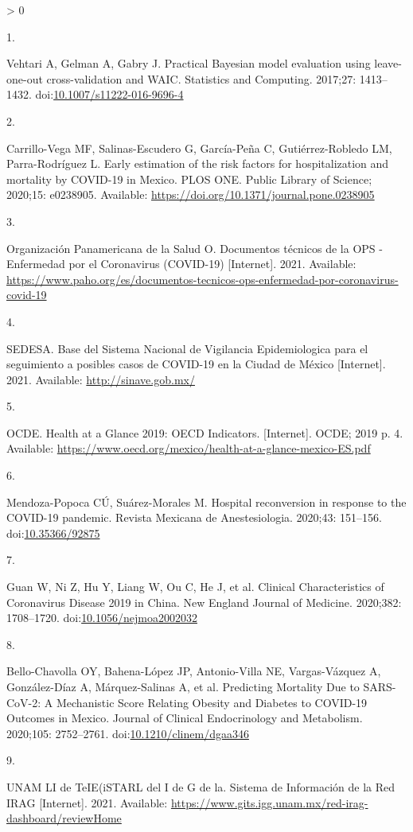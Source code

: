 \documentclass[10pt,letterpaper]{article}
\newlength{\csllabelwidth}
\newlength{\cslhangindent}
\newenvironment{CSLReferences}[3] %
 {%
  \setlength{\parindent}{0pt}
  \ifodd #1 \everypar{\setlength{\hangindent}{\cslhangindent}}\ignorespaces\fi
  \ifnum #2 > 0
  \setlength{\parskip}{#3\baselineskip}
  \fi
 }%
 {}
\newcommand{\CSLLeftMargin}[1]{\parbox[t]{\maxof{\widthof{#1}}{\csllabelwidth}}{#1}}
\newcommand{\CSLRightInline}[1]{\parbox[t]{\linewidth}{#1}}
\begin{document}
\hypertarget{refs}{}
\begin{CSLReferences}{0}{0}
\leavevmode\hypertarget{ref-Vehtari2017}{}%
\CSLLeftMargin{1. }
\CSLRightInline{Vehtari A, Gelman A, Gabry J. {Practical Bayesian model
evaluation using leave-one-out cross-validation and WAIC}. Statistics
and Computing. 2017;27: 1413--1432.
doi:\href{https://doi.org/10.1007/s11222-016-9696-4}{10.1007/s11222-016-9696-4}}

\leavevmode\hypertarget{ref-Carrillo-Vega2020}{}%
\CSLLeftMargin{2. }
\CSLRightInline{Carrillo-Vega MF, Salinas-Escudero G, García-Peña C,
Gutiérrez-Robledo LM, Parra-Rodríguez L. {Early estimation of the risk
factors for hospitalization and mortality by COVID-19 in Mexico}. PLOS
ONE. Public Library of Science; 2020;15: e0238905. Available:
\url{https://doi.org/10.1371/journal.pone.0238905}}

\leavevmode\hypertarget{ref-OrganizacionPanamericanadelaSalud2021}{}%
\CSLLeftMargin{3. }
\CSLRightInline{Organización Panamericana de la Salud O. {Documentos
t{é}cnicos de la OPS - Enfermedad por el Coronavirus (COVID-19)}
{[}Internet{]}. 2021. Available:
\url{https://www.paho.org/es/documentos-tecnicos-ops-enfermedad-por-coronavirus-covid-19}}

\leavevmode\hypertarget{ref-SEDESA2021}{}%
\CSLLeftMargin{4. }
\CSLRightInline{SEDESA. {Base del Sistema Nacional de Vigilancia
Epidemiologica para el seguimiento a posibles casos de COVID-19 en la
Ciudad de M{é}xico} {[}Internet{]}. 2021. Available:
\url{http://sinave.gob.mx/}}

\leavevmode\hypertarget{ref-OCDE2019}{}%
\CSLLeftMargin{5. }
\CSLRightInline{OCDE. {Health at a Glance 2019: OECD Indicators.}
{[}Internet{]}. OCDE; 2019 p. 4. Available:
\url{https://www.oecd.org/mexico/health-at-a-glance-mexico-ES.pdf}}

\leavevmode\hypertarget{ref-Mendoza-Popoca2020}{}%
\CSLLeftMargin{6. }
\CSLRightInline{Mendoza-Popoca CÚ, Suárez-Morales M. {Hospital
reconversion in response to the COVID-19 pandemic}. Revista Mexicana de
Anestesiologia. 2020;43: 151--156.
doi:\href{https://doi.org/10.35366/92875}{10.35366/92875}}

\leavevmode\hypertarget{ref-Guan2020}{}%
\CSLLeftMargin{7. }
\CSLRightInline{Guan W, Ni Z, Hu Y, Liang W, Ou C, He J, et al.
{Clinical Characteristics of Coronavirus Disease 2019 in China}. New
England Journal of Medicine. 2020;382: 1708--1720.
doi:\href{https://doi.org/10.1056/nejmoa2002032}{10.1056/nejmoa2002032}}

\leavevmode\hypertarget{ref-Bello-Chavolla2020}{}%
\CSLLeftMargin{8. }
\CSLRightInline{Bello-Chavolla OY, Bahena-López JP, Antonio-Villa NE,
Vargas-Vázquez A, González-Díaz A, Márquez-Salinas A, et al. {Predicting
Mortality Due to SARS-CoV-2: A Mechanistic Score Relating Obesity and
Diabetes to COVID-19 Outcomes in Mexico}. Journal of Clinical
Endocrinology and Metabolism. 2020;105: 2752--2761.
doi:\href{https://doi.org/10.1210/clinem/dgaa346}{10.1210/clinem/dgaa346}}

\leavevmode\hypertarget{ref-UNAM2021}{}%
\CSLLeftMargin{9. }
\CSLRightInline{UNAM LI de TeIE(iSTARL del I de G de la. {Sistema de
Informaci{ó}n de la Red IRAG} {[}Internet{]}. 2021. Available:
\url{https://www.gits.igg.unam.mx/red-irag-dashboard/reviewHome}}

\end{CSLReferences}

\nolinenumbers
\end{document}

